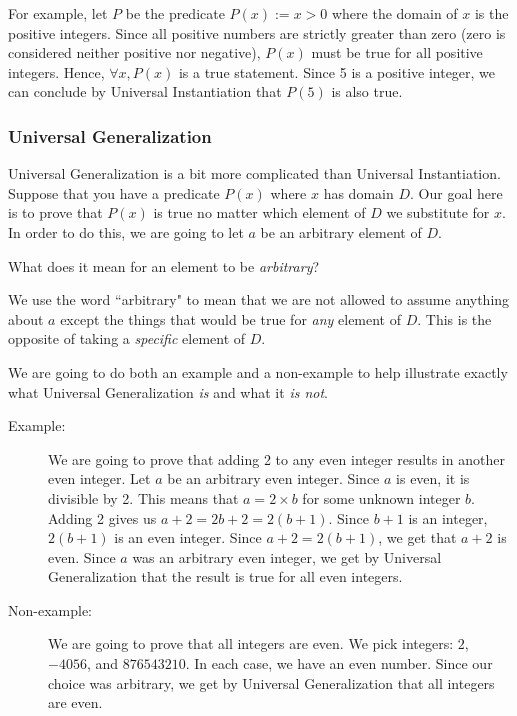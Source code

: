 \documentclass[11pt,oneside]{book}
\theoremstyle{definition}
\begin{document}
For example, let $P$ be the predicate $P(x) := x > 0$ where the domain of $x$ is the positive integers.
Since all positive numbers are strictly greater than zero (zero is considered neither positive nor negative), $P(x)$ must be true for all positive integers.
Hence, $\forall x, P(x)$ is a true statement.
Since 5 is a positive integer, we can conclude by Universal Instantiation that $P(5)$ is also true.

\subsubsection*{Universal Generalization}
Universal Generalization is a bit more complicated than Universal Instantiation.
Suppose that you have a predicate $P(x)$ where $x$ has domain $D$.
Our goal here is to prove that $P(x)$ is true no matter which element of $D$ we substitute for $x$.
In order to do this, we are going to let $a$ be an arbitrary element of $D$.

What does it mean for an element to be \emph{arbitrary}?

We use the word ``arbitrary" to mean that we are not allowed to assume anything about $a$ except the things that would be true for \emph{any} element of $D$.
This is the opposite of taking a \emph{specific} element of $D$.

We are going to do both an example and a non-example to help illustrate exactly what Universal Generalization \emph{is} and what it \emph{is not}.

\begin{description}
    \item[Example:] We are going to prove that adding 2 to any even integer results in another even integer.
    Let $a$ be an arbitrary even integer.
    Since $a$ is even, it is divisible by 2.
    This means that $a = 2 \times b$ for some unknown integer $b$.
    Adding 2 gives us $a + 2 = 2b + 2 = 2(b + 1)$.
    Since $b + 1$ is an integer, $2(b + 1)$ is an even integer.
    Since $a + 2 = 2(b + 1)$, we get that $a + 2$ is even.
    Since $a$ was an arbitrary even integer, we get by Universal Generalization that the result is true for all even integers.

    \item[Non-example:] We are going to prove that all integers are even.
    We pick integers: $2$, $-4056$, and $876543210$.
    In each case, we have an even number.
    Since our choice was arbitrary, we get by Universal Generalization that all integers are even.
\end{description}
\end{document}
